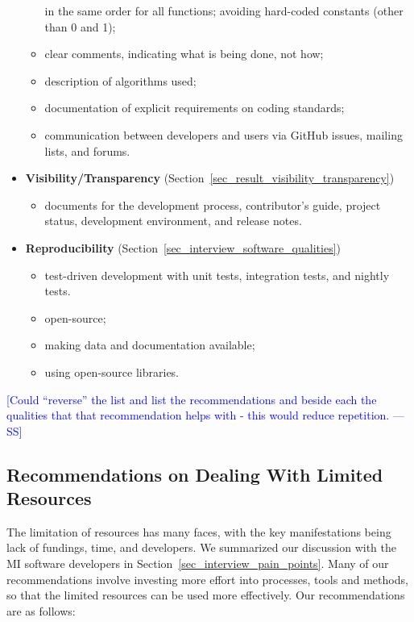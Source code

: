 \documentclass[final, 3p, times, authoryear]{elsarticle}
\newcommand{\authornote}[3]{\textcolor{#1}{[#3 ---#2]}}
\newcommand{\authornote}[3]{}
\newcommand{\wss}[1]{\authornote{blue}{SS}{#1}} %
\begin{document}
\begin{itemize}
\begin{itemize}
    in the same order for all functions; avoiding hard-coded constants (other
    than 0 and 1);
    \item clear comments, indicating what is being done, not how;
    \item description of algorithms used;
    \item documentation of explicit requirements on coding standards;
    \item communication between developers and users via GitHub issues, mailing
    lists, and forums.
\end{itemize}
\item \textbf{Visibility/Transparency} (Section~\ref{sec_result_visibility_transparency})
\begin{itemize}
    \item documents for the development process, contributor's guide, project
    status, development environment, and release notes.
\end{itemize}
\item \textbf{Reproducibility} (Section~\ref{sec_interview_software_qualities})
\begin{itemize}
    \item test-driven development with unit tests, integration tests, and nightly tests.
    \item open-source;
    \item making data and documentation available;
    \item using open-source libraries.
\end{itemize}
\end{itemize}

\wss{Could ``reverse'' the list and list the recommendations and beside each the qualities 
that that recommendation helps with - this would reduce repetition.}

\subsection{Recommendations on Dealing With Limited Resources}
\label{sec_recommendations_limited_resources}

The limitation of resources has many faces, with the key manifestations being
lack of fundings, time, and developers. We summarized our discussion with the MI
software developers in Section~\ref{sec_interview_pain_points}.  Many of our
recommendations involve investing more effort into processes, tools and methods,
so that the limited resources can be used more effectively.  Our recommendations
are as follows:
\end{document}

